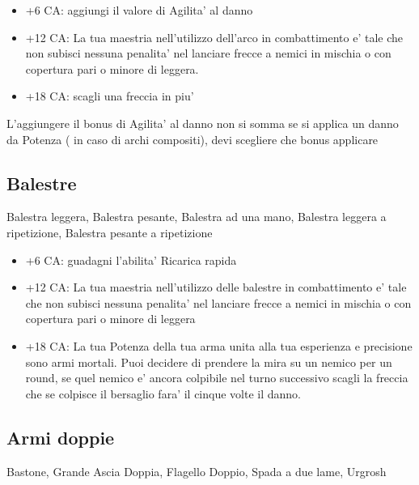 \documentclass[a4paper,11pt,twoside,openany]{dndbook}
\begin{document}
\begin{itemize}

\item +6 CA: aggiungi il valore di Agilita' al danno

\item +12 CA: La tua maestria nell'utilizzo dell'arco in combattimento e' tale che non subisci nessuna penalita' nel lanciare frecce a nemici in mischia o con copertura pari o minore di leggera.

\item +18 CA: scagli una freccia in piu'

\end{itemize}

L'aggiungere il bonus di Agilita' al danno non si somma se si applica un danno da Potenza ( in caso di archi compositi), devi scegliere che bonus applicare

\subsection{Balestre}Balestra leggera, Balestra pesante, Balestra ad una mano, Balestra leggera a ripetizione, Balestra pesante a ripetizione

\begin{itemize}

\item +6 CA: guadagni l'abilita' Ricarica rapida

\item +12 CA: La tua maestria nell'utilizzo delle balestre in combattimento e' tale che non subisci nessuna penalita' nel lanciare frecce a nemici in mischia o con copertura pari o minore di leggera

\item +18 CA: La tua Potenza della tua arma unita alla tua esperienza e precisione sono armi mortali. Puoi decidere di prendere la mira su un nemico per un round, se quel nemico e' ancora colpibile nel turno successivo scagli la freccia che se colpisce il bersaglio fara' il cinque volte il danno.

\end{itemize}

\subsection{Armi doppie} Bastone, Grande Ascia Doppia, Flagello Doppio, Spada a due lame, Urgrosh
\end{document}
